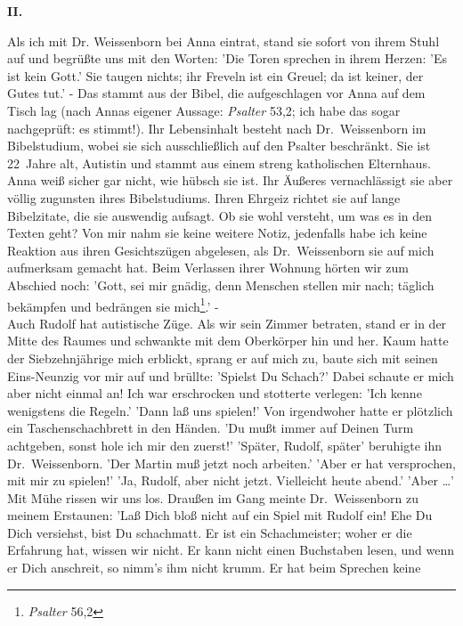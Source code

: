 \begin{center}
{\bf II.}
\end{center}
Als ich mit Dr. Weissenborn bei Anna eintrat, stand sie sofort von ihrem Stuhl
auf und begr\"u{\ss}te uns mit den Worten: 'Die Toren sprechen in ihrem
Herzen: 'Es ist kein Gott.' Sie taugen nichts; ihr Freveln ist ein Greuel; da
ist keiner, der Gutes tut.' - Das stammt aus der Bibel, die aufgeschlagen vor
Anna auf dem Tisch lag (nach Annas eigener Aussage: {\em Psalter\/} 53,2; ich
habe das sogar nachgepr\"uft: es stimmt!). Ihr Lebensinhalt besteht nach
Dr.~Weissenborn im Bibelstudium, wobei sie sich ausschlie{\ss}lich auf den
Psalter beschr\"ankt. Sie ist 22~Jahre alt, Autistin und stammt aus einem
streng katholischen Elternhaus. Anna wei{\ss} sicher gar nicht, wie h\"ubsch
sie ist. Ihr \"Au{\ss}eres vernachl\"assigt sie aber v\"ollig zugunsten ihres
Bibelstudiums. Ihren Ehrgeiz richtet sie auf lange Bibelzitate, die sie
auswendig aufsagt. Ob sie wohl versteht, um was es in den Texten geht? Von
mir nahm sie keine weitere Notiz, jedenfalls habe ich keine Reaktion aus
ihren Gesichtsz\"ugen abgelesen, als Dr.~Weissenborn sie auf mich aufmerksam
gemacht hat. Beim Verlassen ihrer Wohnung h\"orten wir zum Abschied noch:
'Gott, sei mir gn\"adig, denn Menschen stellen mir nach; t\"aglich bek\"ampfen
und bedr\"angen sie mich\footnote{{\em Psalter\/} 56,2}.' - \\
Auch Rudolf hat autistische Z\"uge. Als wir sein Zimmer betraten, stand er
in der Mitte des Raumes und schwankte mit dem Oberk\"orper hin und her. Kaum
hatte der Siebzehnj\"ahrige mich erblickt, sprang er auf mich zu, baute sich
mit seinen Eins-Neunzig vor mir auf und br\"ullte: 'Spielst Du Schach?' Dabei
schaute er mich aber nicht einmal an! Ich war erschrocken und stotterte
verlegen: 'Ich kenne wenigstens die Regeln.' 'Dann la{\ss} uns spielen!' Von
irgendwoher hatte er pl\"otzlich ein Taschenschachbrett in den H\"anden. 'Du
mu{\ss}t immer auf Deinen Turm achtgeben, sonst hole ich mir den zuerst!'
'Sp\"ater, Rudolf, sp\"ater' beruhigte ihn Dr.~Weissenborn. 'Der Martin mu{\ss}
jetzt noch arbeiten.' 'Aber er hat versprochen, mit mir zu spielen!' 'Ja,
Rudolf, aber nicht jetzt. Vielleicht heute abend.' 'Aber \dots ' Mit M\"uhe
rissen wir uns los. Drau{\ss}en im Gang meinte Dr.~Weissenborn zu meinem
Erstaunen: 'La{\ss} Dich blo{\ss} nicht auf ein Spiel mit Rudolf ein! Ehe Du
Dich versiehst, bist Du schachmatt. Er ist ein Schachmeister; woher er die
Erfahrung hat, wissen wir nicht. Er kann nicht einen Buchstaben lesen, und
wenn er Dich anschreit, so nimm's ihm nicht krumm. Er hat beim Sprechen keine
